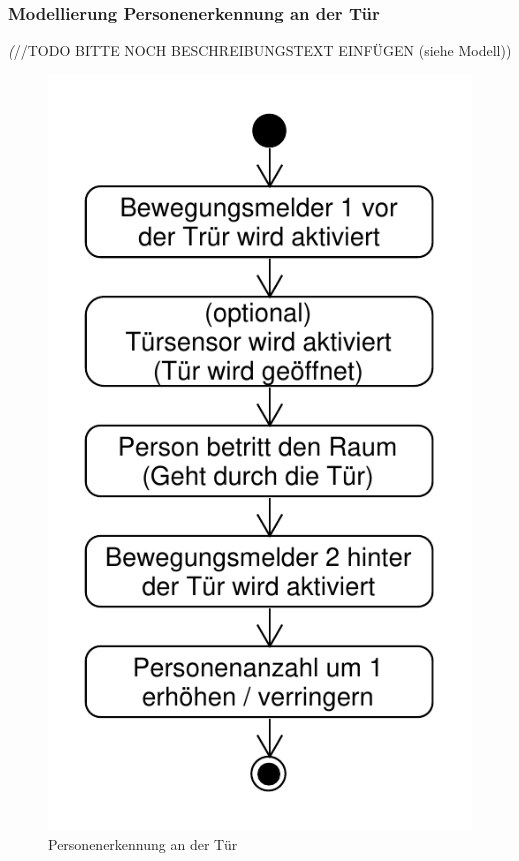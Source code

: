 \subsubsection{Modellierung Personenerkennung an der Tür}
\emph(//TODO BITTE NOCH BESCHREIBUNGSTEXT EINFÜGEN (siehe Modell))
\begin{figure}[h!]
	\centering
	\includegraphics[scale=0.8]{img/Szenarien/PersonenerkennungAnTuer.pdf}
	\caption{Personenerkennung an der Tür}
	\label{fig:szenarienPersonenerkennungTür}
\end{figure}

